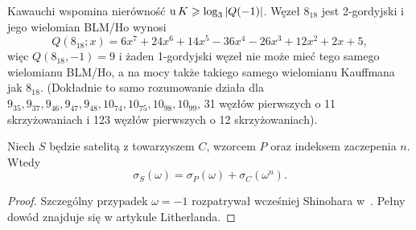 Kawauchi \cite[s. 151]{kawauchi1996} wspomina nierówność $\operatorname{u} K \geqslant \log_3 |Q(-1)|$.
Węzeł $8_{18}$ jest 2-gordyjski i jego wielomian BLM/Ho wynosi
\begin{equation}
    Q (8_{18}; x) = 6x^7 + 24x^6 + 14x^5 - 36x^4 - 26x^3 + 12x^2 + 2x + 5,
\end{equation}
więc $Q (8_{18}, -1) = 9$ i żaden 1-gordyjski węzeł nie może mieć tego samego wielomianu BLM/Ho, a na mocy także takiego samego wielomianu Kauffmana jak $8_{18}$.
(Dokładnie to samo rozumowanie działa dla $9_{35}, 9_{37}, 9_{46}, 9_{47}, 9_{48}, 10_{74}, 10_{75}, 10_{98}, 10_{99}$, 31 węzłów pierwszych o 11 skrzyżowaniach i 123 węzłów pierwszych o 12 skrzyżowaniach).

\begin{proposition}
%
    Niech $S$ będzie satelitą z towarzyszem $C$, wzorcem $P$ oraz indeksem zaczepenia $n$.
    Wtedy
    \begin{equation}
        \sigma_S(\omega) = \sigma_P(\omega) + \sigma_C(\omega^n).
    \end{equation}
\end{proposition}

\begin{proof}
    Szczególny przypadek $\omega = -1$ rozpatrywał wcześniej Shinohara w~\cite{shinohara1971}.
%
    Pełny dowód znajduje się w artykule \cite{litherland1979} Litherlanda.
%
\end{proof}

